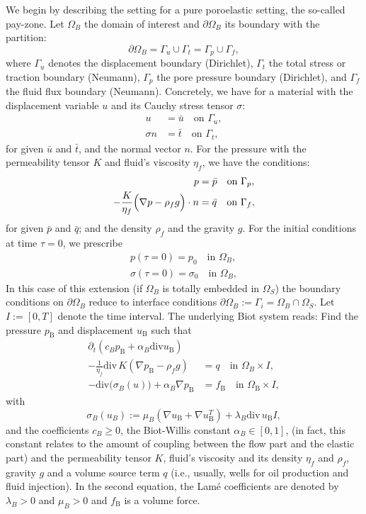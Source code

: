 We begin by describing the setting for a pure poroelastic setting, 
the so-called pay-zone.
Let $\Omega_B$ the domain of interest and $\partial\Omega_B$ its boundary
with the partition:
\begin{equation*}
\partial\Omega_B = \Gamma_u \cup \Gamma_t = \Gamma_p \cup \Gamma_f,
\end{equation*}
where $\Gamma_u$ denotes the displacement boundary (Dirichlet), $\Gamma_t$ the 
total stress or traction boundary (Neumann), $\Gamma_p$ the pore 
pressure boundary (Dirichlet), and $\Gamma_f$ the fluid flux boundary
(Neumann). Concretely, we have for a material 
with the displacement variable $u$ and its 
Cauchy stress tensor $\sigma$:
\begin{align*}
u &= \bar{u} \quad \text{on } \Gamma_u, \\
\sigma n &= \bar{t} \quad \text{on } \Gamma_t, 
\end{align*}
for given $\bar{u}$ and $\bar{t}$, and the 
normal vector $n$. 
For the pressure with the permeability tensor 
$K$ and fluid's viscosity $\eta_f$, we have the conditions:
\begin{align*}
p &= \bar{p} \quad \text{on } \Gamma_p, \\
- \frac{K}{\eta_f} \Bigl( \nabla p - \rho_f g\Bigr) \cdot n &= \bar{q}\quad \text{on } \Gamma_f,
\end{align*}
for given $\bar{p}$ and $\bar{q}$; and the density $\rho_f$ and the gravity $g$.
For the initial conditions at time $\tau=0$, we prescribe
\begin{align*}
p(\tau =0) = p_0 \quad \text{in } \Omega_B,\\
\sigma(\tau =0) = \sigma_0 \quad \text{in } \Omega_B,
\end{align*}
In this case of this extension
(if $\Omega_B$ is totally embedded in $\Omega_S$)
the boundary conditions on $\partial\Omega_B$ reduce 
to interface conditions $\partial\Omega_B :=\Gamma_i =
\Omega_B \cap \Omega_S$.
Let $I:=[0,T]$ denote the time interval.
The underlying Biot system reads:
Find the pressure $p_{\text{B}}$ and displacement 
$u_{\text{B}}$ such that
\begin{align*}
\partial_t (c_B p_{\text{B}} + \alpha_B \text{div}u_{\text{B}})\\ -
\frac{1}{\eta_f} \text{div}\, K 
(\nabla p_{\text{B}} - \rho_f g) &= q \quad \text{in }\Omega_{B} \times I, \\
- \text{div}\bigl( \sigma_B (u) \bigr)
+ \alpha_B\nabla p_{\text{B}} &= f_{\text{B}} 
\quad \text{in }\Omega_{\text{B}} \times I,
\end{align*}
with
\[
\sigma_B(u_B) := \mu_B(\nabla u_{\text{B}} + \nabla u_{\text{B}}^T) +  
\lambda_B\text{div}\, u_{\text{B}}I,
\]
and the coefficients $c_B\geq 0$, 
the Biot-Willis constant $\alpha_B \in [0,1]$,
(in fact, this constant relates to the amount of 
coupling between the flow part and the elastic part) 
and the permeability tensor $K$, 
fluid's viscosity and its density 
$\eta_f$ and $\rho_f$, gravity $g$ and a volume 
source term $q$ (i.e., usually, wells for oil production and
fluid injection). In the second equation,
the Lam\'e coefficients are denoted 
by $\lambda_B >0$ and $\mu_B >0$ 
and $f_{\text{B}}$ is a volume force.


